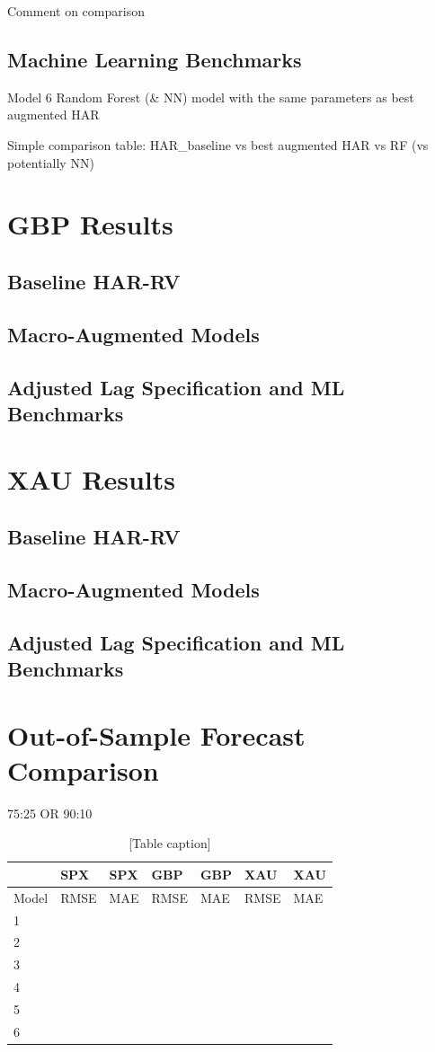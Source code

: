 \documentclass[12pt,a4paper]{report}
\begin{document}
Comment on comparison

\subsection{Machine Learning Benchmarks}
Model 6 Random Forest (\& NN) model with the same parameters as best augmented HAR

Simple comparison table: HAR_baseline vs best augmented HAR vs RF (vs potentially NN)

\section{GBP Results}
\subsection{Baseline HAR-RV}
\subsection{Macro-Augmented Models}
\subsection{Adjusted Lag Specification and ML Benchmarks}
\section{XAU Results}
\subsection{Baseline HAR-RV}
\subsection{Macro-Augmented Models}
\subsection{Adjusted Lag Specification and ML Benchmarks}
\section{Out-of-Sample Forecast Comparison}
75:25 OR 90:10

\begin{table}[H]
\centering
\begin{tabular}{|l|l|l|l|l|l|l|}
\hline
 & SPX & SPX & GBP & GBP & XAU & XAU \\
\hline
Model & RMSE & MAE & RMSE & MAE & RMSE & MAE \\
\hline
1 &  &  &  &  &  &  \\
\hline
2 &  &  &  &  &  &  \\
\hline
3 &  &  &  &  &  &  \\
\hline
4 &  &  &  &  &  &  \\
\hline
5 &  &  &  &  &  &  \\
\hline
6 &  &  &  &  &  &  \\
\hline
\end{tabular}
\caption{[Table caption]}
\end{table}
\end{document}
